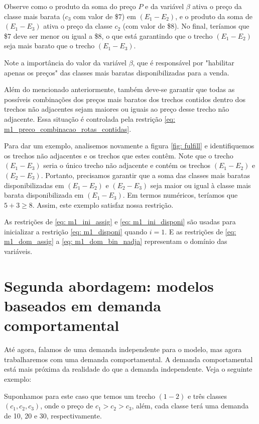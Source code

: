 Observe como o produto da soma do preço $P$ e da variável $\beta$ ativa o preço da classe mais barata ($c_3$ com valor de \$7) em $(E_1-E_2)$, e o produto da soma de $(E_1-E_3)$ ativa o preço da classe $c_2$ (com valor de \$8). No final, teríamos que \$7 deve ser menor ou igual a \$8, o que está garantindo que o trecho $(E_1-E_2)$ seja mais barato que o trecho $(E_1-E_3)$.

Note a importância do valor da variável $\beta$, que é responsável por "habilitar apenas os preços" das classes mais baratas disponibilizadas para a venda.

Além do mencionado anteriormente, também deve-se garantir que todas as possíveis combinações dos preços mais baratos dos trechos contidos dentro dos trechos não adjacentes sejam maiores ou iguais ao preço desse trecho não adjacente. Essa situação é controlada pela restrição \ref{eq: m1_preco_combinacao_rotas_contidas}.

Para dar um exemplo, analisemos novamente a figura \ref{fig: fulfill} e identifiquemos os trechos não adjacentes e os trechos que estes contêm. Note que o trecho $(E_1-E_3)$ seria o único trecho não adjacente e contém os trechos $(E_1-E_2)$ e $(E_2-E_3)$. Portanto, precisamos garantir que a soma das classes mais baratas disponibilizadas em $(E_1-E_2)$ e $(E_2-E_3)$ seja maior ou igual à classe mais barata disponibilizada em $(E_1-E_3)$. Em termos numéricos, teríamos que $5+3 \geq 8$. Assim, este exemplo satisfaz nossa restrição.

As restrições de \ref{eq: m1_ini_assig} e \ref{eq: m1_ini_disponi} são usadas para inicializar a restrição \ref{eq: m1_disponi} quando \(i = 1\). E as restrições de \ref{eq: m1_dom_assig} a \ref{eq: m1_dom_bin_nadja} representam o domínio das variáveis.


\section{Segunda abordagem: modelos baseados em demanda comportamental} \label{sec: modelagemComportamental}

Até agora, falamos de uma demanda independente para o modelo, mas agora trabalharemos com uma demanda comportamental. A demanda comportamental está mais próxima da realidade do que a demanda independente. Veja o seguinte exemplo:

Suponhamos para este caso que temos um trecho $(1-2)$ e três classes $(c_1, c_2, c_3)$, onde o preço de $c_1 > c_2 > c_3$, além, cada classe terá uma demanda de 10, 20 e 30, respectivamente.

